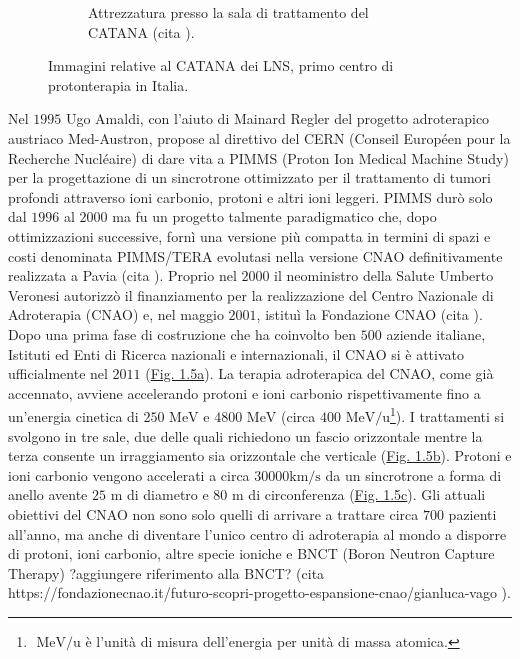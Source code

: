 \documentclass[12pt,a4paper,twoside]{report}
\begin{document}
\begin{figure}[H]
\begin{subfigure}[b]{0.49\textwidth}
			\caption{Attrezzatura presso la sala di trattamento del CATANA (cita
				).}
			\label{fig:catana2}
		\end{subfigure}
		\caption{Immagini relative al CATANA dei LNS, primo centro di protonterapia in Italia.}
		\label{fig:catana}
	\end{figure}
	
	Nel $1995$ Ugo Amaldi, con l'aiuto di Mainard Regler del progetto adroterapico austriaco Med-Austron, propose al direttivo del CERN (Conseil Européen pour la Recherche Nucléaire) di dare vita a PIMMS (Proton Ion Medical Machine Study) per la progettazione di un sincrotrone ottimizzato per il trattamento di tumori profondi attraverso ioni carbonio, protoni e altri ioni leggeri. PIMMS durò solo dal $1996$ al $2000$ ma fu un progetto talmente paradigmatico che, dopo ottimizzazioni successive, fornì una versione più compatta in termini di spazi e costi denominata PIMMS/TERA evolutasi nella versione CNAO definitivamente realizzata a Pavia (cita
	). Proprio nel $2000$ il neoministro della Salute Umberto Veronesi autorizzò il finanziamento per la realizzazione del Centro Nazionale di Adroterapia (CNAO) e, nel maggio $2001$, istituì la Fondazione CNAO (cita
	). Dopo una prima fase di costruzione che ha coinvolto ben $500$ aziende italiane, Istituti ed Enti di Ricerca nazionali e internazionali, il CNAO si è attivato ufficialmente nel $2011$ (\hyperref[fig:edificio_cnao]{Fig. 1.5a}). La terapia adroterapica del CNAO, come già accennato, avviene accelerando protoni e ioni carbonio rispettivamente fino a un'energia cinetica di $250 \mbox{ MeV}$ e $4800\mbox{ MeV}$ (circa $400\mbox{ MeV/u}$\footnote{$\mbox{ MeV/u}$ è l'unità di misura dell'energia per unità di massa atomica.}). I trattamenti si svolgono in tre sale, due delle quali richiedono un fascio orizzontale mentre la terza consente un irraggiamento sia orizzontale che verticale (\hyperref[fig:sala_cnao]{Fig. 1.5b}). Protoni e ioni carbonio vengono accelerati a circa $30000\mbox{km/s}$ da un sincrotrone a forma di anello avente $25\mbox{ m}$ di diametro e $80\mbox{ m}$ di circonferenza (\hyperref[fig:sincrotrone_cnao]{Fig. 1.5c}). Gli attuali obiettivi del CNAO non sono solo quelli di arrivare a trattare circa $700$ pazienti all’anno, ma anche di diventare l’unico centro di adroterapia al mondo a disporre di protoni, ioni carbonio, altre specie ioniche e BNCT (Boron Neutron Capture Therapy) ?aggiungere riferimento alla BNCT? (cita
	https://fondazionecnao.it/futuro-scopri-progetto-espansione-cnao/gianluca-vago
	).
	
\end{document}
